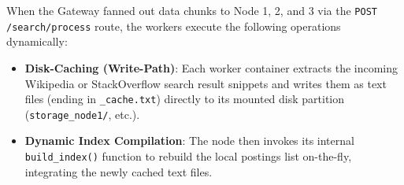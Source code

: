 \documentclass[11pt,a4paper]{article}
\begin{document}
When the Gateway fanned out data chunks to Node 1, 2, and 3 via the \texttt{POST /search/process} route, the workers execute the following operations dynamically:
\begin{itemize}
    \item \textbf{Disk-Caching (Write-Path)}: Each worker container extracts the incoming Wikipedia or StackOverflow search result snippets and writes them as text files (ending in \texttt{\_cache.txt}) directly to its mounted disk partition (\texttt{storage\_node1/}, etc.).
    \item \textbf{Dynamic Index Compilation}: The node then invokes its internal \texttt{build\_index()} function to rebuild the local postings list on-the-fly, integrating the newly cached text files.
\end{itemize}
\end{document}
